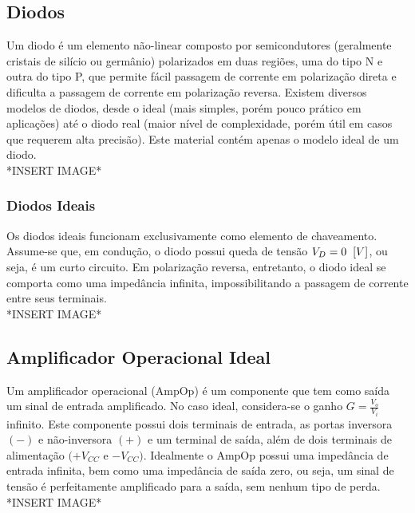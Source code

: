 \documentclass{article}
\numberwithin{equation}{section}
\begin{document}
    \subsection{Diodos}
    \label{subsec:diodos}
    Um diodo é um elemento não-linear composto por semicondutores (geralmente cristais de silício ou germânio) polarizados em duas regiões, uma do tipo N e outra do tipo P, que permite fácil passagem de corrente em polarização direta e dificulta a passagem de corrente em polarização reversa. Existem diversos modelos de diodos, desde o ideal (mais simples, porém pouco prático em aplicações) até o diodo real (maior nível de complexidade, porém útil em casos que requerem alta precisão). Este material contém apenas o modelo ideal de um diodo. \\
    *INSERT IMAGE*

    \subsubsection{Diodos Ideais}
    \label{subsubsec:diodos}
    Os diodos ideais funcionam exclusivamente como elemento de chaveamento. Assume-se que, em condução, o diodo possui queda de tensão $V_{D}=0 \hspace{0.2cm}[V]$, ou seja, é um curto circuito. Em polarização reversa, entretanto, o diodo ideal se comporta como uma impedância infinita, impossibilitando a passagem de corrente entre seus terminais. \\
    *INSERT IMAGE*

    \subsection{Amplificador Operacional Ideal}
    \label{subsec:ampop}
    Um amplificador operacional (AmpOp) é um componente que tem como saída um sinal de entrada amplificado. No caso ideal, considera-se o ganho $G=\displaystyle{\frac{V_{o}}{V_{i}}}$ infinito. Este componente possui dois terminais de entrada, as portas inversora $(-)$ e não-inversora $(+)$ e um terminal de saída, além de dois terminais de alimentação $(+V_{CC}$ e $-V_{CC})$. Idealmente o AmpOp possui uma impedância de entrada infinita, bem como uma impedância de saída zero, ou seja, um sinal de tensão é perfeitamente amplificado para a saída, sem nenhum tipo de perda. \\
    *INSERT IMAGE*
\end{document}
